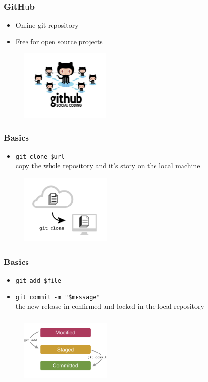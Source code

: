 \documentclass{beamer}
\begin{document}
\begin{frame}
\frametitle{GitHub}
\begin{itemize}
\item Online git repository
\item Free for open source projects
\end{itemize}
\begin{figure}
\centering
\includegraphics[height=3.5cm, width=4.5cm]{github_logo}
\end{figure}
\end{frame}

\begin{frame}[fragile]
\frametitle{Basics}
\begin{itemize}
\item \verb!git clone $url! \\
copy the whole repository and it's story on the local machine
\end{itemize}
\begin{figure}
\centering
\includegraphics[height=3.5cm, width=4.5cm]{clone}
\end{figure}
\end{frame}

\begin{frame}[fragile]
\frametitle{Basics}
\begin{itemize}
\item \verb!git add $file! 
\item \verb!git commit -m "$message"! \\
the new release in confirmed and locked in the local repository
\end{itemize}
\begin{figure}
\centering
\includegraphics[height=3.5cm, width=4.5cm]{commit}
\end{figure}
\end{frame}
\end{document}
